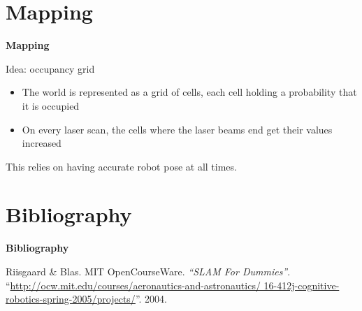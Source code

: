 \documentclass[xcolor=dvipsnames]{beamer}
\begin{document}
  {
    \begin{frame}{}
    \end{frame}
  }
  
  \section{Mapping}
  \begin{frame}{\bf Mapping}

    Idea: occupancy grid
    \vspace{1cm}

    \begin{itemize}
    \item The world is represented as a grid of cells, each cell holding a
          probability that it is occupied
    \item On every laser scan, the cells where the laser beams end get their
          values increased
    \end{itemize}
    \vspace{1cm}

    This relies on having accurate robot pose at all times.
  \end{frame}
  
  \section{Bibliography}
  \begin{frame}{\bf Bibliography}
    \begin{thebibliography}{3}

     Riisgaard \& Blas. MIT OpenCourseWare.
      \newblock \emph{``SLAM For Dummies''}.
      \newblock
      ``\url{http://ocw.mit.edu/courses/aeronautics-and-astronautics/
        16-412j-cognitive-robotics-spring-2005/projects/}''. 2004.
      
    \end{thebibliography}
  \end{frame}
  
\end{document}
